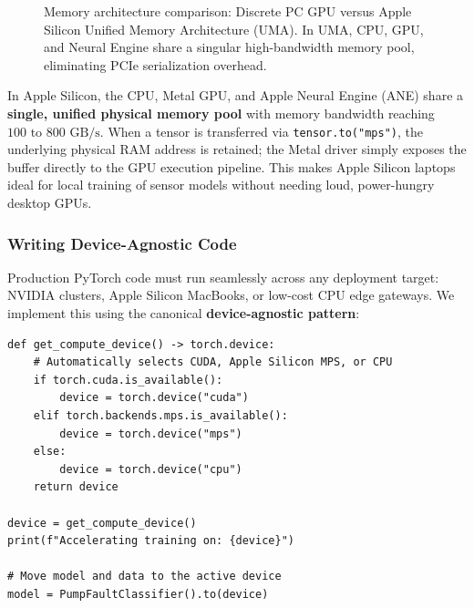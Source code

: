 \begin{figure}[htbp]
\caption{Memory architecture comparison: Discrete PC GPU versus Apple Silicon Unified Memory Architecture (UMA). In UMA, CPU, GPU, and Neural Engine share a singular high-bandwidth memory pool, eliminating PCIe serialization overhead.}\label{fig:apple_silicon_uma}
\end{figure}

In Apple Silicon, the CPU, Metal GPU, and Apple Neural Engine (ANE) share a \textbf{single, unified physical memory pool} with memory bandwidth reaching $100\text{ to }800\text{ GB/s}$. When a tensor is transferred via \texttt{tensor.to("mps")}, the underlying physical RAM address is retained; the Metal driver simply exposes the buffer directly to the GPU execution pipeline. This makes Apple Silicon laptops ideal for local training of sensor models without needing loud, power-hungry desktop GPUs.

\subsubsection{Writing Device-Agnostic Code}

Production PyTorch code must run seamlessly across any deployment target: NVIDIA clusters, Apple Silicon MacBooks, or low-cost CPU edge gateways. We implement this using the canonical \textbf{device-agnostic pattern}:

\begin{lstlisting}[style=pythonstyle, caption={Device-agnostic hardware selection pattern.}]
def get_compute_device() -> torch.device:
    # Automatically selects CUDA, Apple Silicon MPS, or CPU
    if torch.cuda.is_available():
        device = torch.device("cuda")
    elif torch.backends.mps.is_available():
        device = torch.device("mps")
    else:
        device = torch.device("cpu")
    return device

device = get_compute_device()
print(f"Accelerating training on: {device}")

# Move model and data to the active device
model = PumpFaultClassifier().to(device)
\end{lstlisting}

